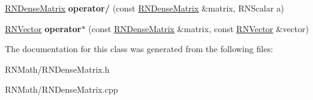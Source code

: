 \begin{DoxyCompactItemize}
\item 
\hyperlink{class_r_n_dense_matrix}{R\+N\+Dense\+Matrix} {\bfseries operator/} (const \hyperlink{class_r_n_dense_matrix}{R\+N\+Dense\+Matrix} \&matrix, R\+N\+Scalar a)\hypertarget{class_r_n_dense_matrix_ab86f96f815d715fb24787231f7d21d48}{}\label{class_r_n_dense_matrix_ab86f96f815d715fb24787231f7d21d48}

\item 
\hyperlink{class_r_n_vector}{R\+N\+Vector} {\bfseries operator$\ast$} (const \hyperlink{class_r_n_dense_matrix}{R\+N\+Dense\+Matrix} \&matrix, const \hyperlink{class_r_n_vector}{R\+N\+Vector} \&vector)\hypertarget{class_r_n_dense_matrix_a1519c4a44f187b9e26590228dbbd69a9}{}\label{class_r_n_dense_matrix_a1519c4a44f187b9e26590228dbbd69a9}

\end{DoxyCompactItemize}


The documentation for this class was generated from the following files\+:\begin{DoxyCompactItemize}
\item 
R\+N\+Math/R\+N\+Dense\+Matrix.\+h\item 
R\+N\+Math/R\+N\+Dense\+Matrix.\+cpp\end{DoxyCompactItemize}
